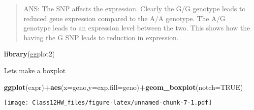 \documentclass[
]{article}
\newenvironment{Shaded}{\begin{snugshade}}{\end{snugshade}}
\newcommand{\AttributeTok}[1]{\textcolor[rgb]{0.13,0.29,0.53}{#1}}
\newcommand{\ConstantTok}[1]{\textcolor[rgb]{0.56,0.35,0.01}{#1}}
\newcommand{\FunctionTok}[1]{\textcolor[rgb]{0.13,0.29,0.53}{\textbf{#1}}}
\newcommand{\NormalTok}[1]{#1}
\newcommand{\SpecialCharTok}[1]{\textcolor[rgb]{0.81,0.36,0.00}{\textbf{#1}}}
\begin{document}
\begin{quote}
ANS: The SNP affects the expression. Clearly the G/G genotype leads to
reduced gene expression compared to the A/A genotype. The A/G genotype
leads to an expression level between the two. This shows how the having
the G SNP leads to reduction in expression.
\end{quote}

\begin{Shaded}
\begin{Highlighting}[]
\FunctionTok{library}\NormalTok{(ggplot2)}
\end{Highlighting}
\end{Shaded}

Lets make a boxplot

\begin{Shaded}
\begin{Highlighting}[]
\FunctionTok{ggplot}\NormalTok{(expr)}\SpecialCharTok{+}\FunctionTok{aes}\NormalTok{(}\AttributeTok{x=}\NormalTok{geno,}\AttributeTok{y=}\NormalTok{exp,}\AttributeTok{fill=}\NormalTok{geno)}\SpecialCharTok{+}\FunctionTok{geom\_boxplot}\NormalTok{(}\AttributeTok{notch=}\ConstantTok{TRUE}\NormalTok{)}
\end{Highlighting}
\end{Shaded}

\texttt{[image: Class12HW\_files/figure-latex/unnamed-chunk-7-1.pdf]}
\end{document}
